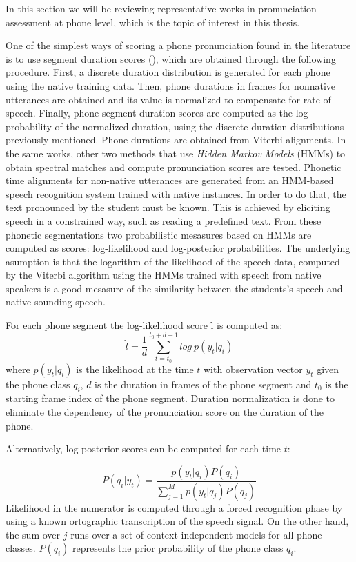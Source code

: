 In this section we will be reviewing representative works in pronunciation assessment
at phone level, which is the topic of interest in this thesis.

One of the simplest ways of scoring a phone pronunciation found in the literature 
is to use segment duration scores (\cite{pronunciation_scoring_instruction, pronunciation_scoring_phone_segments_instruction}), which are obtained through the following
procedure. First, a discrete duration distribution is generated for each phone
using the native training data. 
Then, phone durations in frames for nonnative utterances are obtained 
and its value is normalized to compensate for rate of speech. 
Finally, phone-segment-duration scores are computed as 
the log-probability of the normalized duration, using the discrete duration 
distributions previously mentioned. Phone durations are obtained from Viterbi alignments.
In the same works, other two methods that use \textit{Hidden Markov Models} (HMMs) to obtain 
spectral matches and compute pronunciation scores are tested. 
Phonetic time alignments for
non-native utterances are generated from an HMM-based speech recognition system trained
with native instances. In order to do that, the text pronounced by the student 
must be known. This is achieved by eliciting speech in a
constrained way, such as reading a predefined text.
From these phonetic segmentations two 
probabilistic mesasures based on HMMs are computed as scores: log-likelihood and 
log-posterior probabilities. The underlying asumption is that the logarithm of the likelihood
of the speech data, computed by the Viterbi algorithm using the HMMs trained with speech from native
speakers is a good mesasure of the similarity between the students's
speech and native-sounding speech.

For each phone segment the log-likelihood score \^{l} is computed as:
\begin{equation}
\hat{l} = \frac{1}{d} \sum_{t=t_{0}}^{t_{0}+d-1} log \ p(y_{t}|q_{i})
\end{equation}
where $p(y_{t}|q_{i})$ is the likelihood at the time $t$ with observation vector $y_{t}$
given the phone class $q_{i}$, $d$ is the duration in frames of the phone segment 
and $t_{0}$ is the starting frame index of the phone segment. Duration normalization is done to 
eliminate the dependency of the pronunciation score on the duration of the phone.

Alternatively, log-posterior scores can be computed for each time $t$:

\begin{equation}
P(q_{i}|y_{t}) = \frac{p(y_{t}|q_{i})P(q_{i})}{\sum\limits_{j=1}^{M} p(y_{t}|q_{j})P(q_{j})}
\end{equation}
Likelihood in the numerator is computed through a forced recognition phase by using a known 
ortographic transcription of the speech signal. On the other hand, 
the sum over $j$ runs over a set of context-independent models for all phone classes. $P(q_{i})$
represents the prior probability of the phone class $q_{i}$. 

